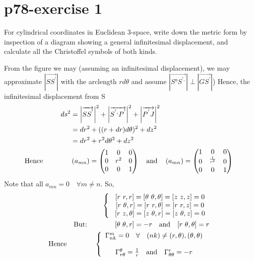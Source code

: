 \section{p78-exercise 1}
\begin{tcolorbox}
For cylindrical coordinates in Euclidean 3-space, write down the metric form by inspection of a diagram showing a general infinitesimal displacement, and calculate all the Christoffel symbols of both kinds.
\end{tcolorbox}
\begin{figure}[h]


\label{fig:fig_p78_247_a}
\end{figure}
From the figure we may (assuming an infinitesimal displacement), we may approximate $\left| \overrightarrow{SS^{'}} \right|$ with the arclength $r d\theta$ and assume $\left|  \overrightarrow{S°S^{',}} \right| \perp \left|  \overrightarrow{GS^{'}} \right|$) Hence, the infinitesimal displacement from S
\begin{align}
\ ds^2 &= \left| \overrightarrow{SS^{'}} \right|^2 + \left| \overrightarrow{S^{',}P^{'}} \right|^2+\left| \overrightarrow{P^{'}J} \right|^2\\
\ &= dr^2 + ((r+dr)d\theta)^2 + dz^2\\
\ &= dr^2 + r^2d\theta^2 + dz^2\\
\text{Hence} \quad\quad\quad\quad &\left(a_{mn}\right) = \begin{pmatrix}
 1& 0 & 0 \\
 0&  r^2&0  \\
 0&0  &1  \\
\end{pmatrix}\quad\text{and}\quad \left(a_{mn}\right) = \begin{pmatrix}
 1& 0 & 0 \\
 0&  ^\frac{1}{r^2}&0  \\
 0&0  &1  \\
\end{pmatrix}
\end{align}
Note that all $a_{mn} = 0 \quad \forall m\ne n$. So,
\begin{align}
\left \{ \begin{array}{c}
\ [r \ r,r]=[\theta \  \theta, \theta] = [z \ z,z] = 0\\
\ [r \ \theta,r]=[r \ r, \theta] = [r \ r,z] = 0\\
\ [r \ z,\theta]=[z \  \theta, r] = [z \ \theta,z] = 0\\
\end{array}\right.\\
\text{But:}\quad\quad\quad\quad [\theta \ \theta,r]= -r \quad\text{and}\quad [r \  \theta, \theta] = r\\
\text{Hence}\quad\quad\quad\quad \left \{ \begin{array}{c}
\Gamma^m_{nk} = 0 \quad\forall\quad (nk) \ne (r, \theta), (\theta, \theta)\\\\
\Gamma^{\theta}_{r\theta} = \frac{1}{r} \quad\text{and}\quad \Gamma^r_{\theta\theta} = -r
\end{array}\right.\
\end{align}

